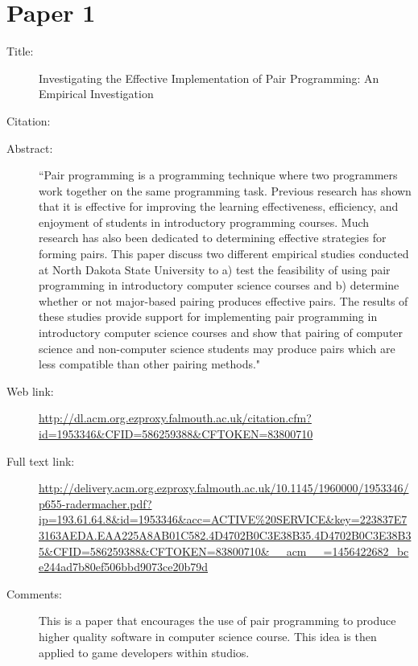 \documentclass{scrartcl}
\begin{document}
\section*{Paper 1}
\begin{description}
\item[Title:] Investigating the Effective Implementation of Pair Programming: An Empirical Investigation
\item[Citation:] \cite{Radermacher:2011}
\item[Abstract:] ``Pair programming is a programming technique where two programmers work together on the same programming task. Previous research has shown that it is effective for improving the learning effectiveness, efficiency, and enjoyment of students in introductory programming courses. Much research has also been dedicated to determining effective strategies for forming pairs. This paper discuss two different empirical studies conducted at North Dakota State University to a) test the feasibility of using pair programming in introductory computer science courses and b) determine whether or not major-based pairing produces effective pairs. The results of these studies provide support for implementing pair programming in introductory computer science courses and show that pairing of computer science and non-computer science students may produce pairs which are less compatible than other pairing methods."
\item[Web link:] \url{http://dl.acm.org.ezproxy.falmouth.ac.uk/citation.cfm?id=1953346&CFID=586259388&CFTOKEN=83800710}
\item[Full text link:] \url{http://delivery.acm.org.ezproxy.falmouth.ac.uk/10.1145/1960000/1953346/p655-radermacher.pdf?ip=193.61.64.8&id=1953346&acc=ACTIVE%20SERVICE&key=223837E73163AEDA.EAA225A8AB01C582.4D4702B0C3E38B35.4D4702B0C3E38B35&CFID=586259388&CFTOKEN=83800710&__acm__=1456422682_bce244ad7b80ef506bbd9073ce20b79d}
\item[Comments:] This is a paper that encourages the use of pair programming to produce higher quality software in computer science course. This idea is then applied to game developers within studios.
\end{description}
\end{document}
